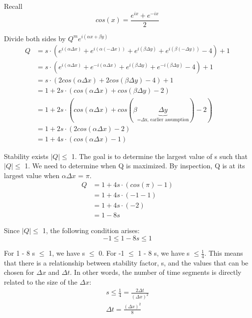 \documentclass[11pt]{article}
\begin{document}
Recall \begin{equation}
cos(x) = \frac{e^{ix} + e^{-ix}}{2} 
\end{equation}

Divide both sides by \(Q^{m}e^{i(\alpha x + \beta y)}\) \begin{equation}
\begin{split}
Q &= s \cdot (e^{i(\alpha \Delta x)} + e^{i(\alpha (-\Delta x))} + e^{i(\beta \Delta y)} + e^{i(\beta (-\Delta y))} - 4) + 1 \\
&= s \cdot (e^{i(\alpha \Delta x)} + e^{-i(\alpha \Delta x)} + e^{i(\beta \Delta y)} + e^{-i(\beta \Delta y)} - 4) + 1 \\
&= s \cdot (2 cos (\alpha \Delta x) + 2 cos (\beta \Delta y) - 4) + 1 \\
&= 1 + 2 s \cdot (cos (\alpha \Delta x) + cos (\beta \Delta y) - 2) \\
&= 1 + 2 s \cdot (cos (\alpha \Delta x) + cos (\beta \underbrace{\Delta y}_{\text{=$\Delta$x, earlier assumption}}) - 2) \\
&= 1 + 2 s \cdot (2 cos (\alpha \Delta x) - 2) \\
&= 1 + 4 s \cdot (cos (\alpha \Delta x) - 1)
\end{split}
\end{equation}

Stability exists \(\vert Q \vert \leq\) 1. The goal is to determine the
largest value of s such that \(\vert Q \vert \leq\) 1. We need to
determine when Q is maximized. By inspection, Q is at its largest value
when \(\alpha \Delta x\) = \(\pi\). \begin{equation}
\begin{split}
Q &= 1 + 4 s \cdot (cos (\pi) - 1) \\
&= 1 + 4 s \cdot (-1 - 1) \\
&= 1 + 4 s \cdot (-2) \\
&= 1 - 8 s 
\end{split}
\end{equation}

Since \(\vert Q \vert \leq\) 1, the following condition arises:
\begin{equation}
-1 \leq 1 - 8 s \leq 1
\end{equation}

For 1 - 8 s \(\leq\) 1, we have s \(\leq\) 0. For -1 \(\leq\) 1 - 8 s,
we have s \(\leq \frac{1}{4}\). This means that there is a relationship
between stability factor, s, and the values that can be chosen for
\(\Delta x\) and \(\Delta t\). In other words, the number of time
segments is directly related to the size of the \(\Delta x\):
\begin{equation}
\begin{split}
s \leq \frac{1}{4} = \frac{2 \Delta t}{(\Delta x)^2} \\
\Delta t = \frac{(\Delta x)^2}{8}
\end{split}
\end{equation}
\end{document}
